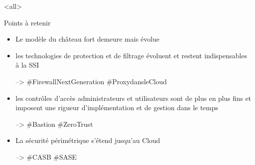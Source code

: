 \mode<all>{\texframe
{Points à retenir} %
{} %
{
\begin{itemize}
    \item Le modèle du château fort demeure mais évolue
    \item les technologies de protection et de filtrage évoluent et restent indispensables à la SSI
    
    --> \#FirewallNextGeneration \#ProxydansleCloud
    \item les contrôles d'accès administrateurs et utilisateurs sont de plus en plus fins et imposent une rigueur d'implémentation et de gestion dans le temps
    
     --> \#Bastion \#ZeroTrust
    \item La sécurité périmétrique s'étend jusqu'au Cloud
    
     --> \#CASB \#SASE
\end{itemize}
}}
